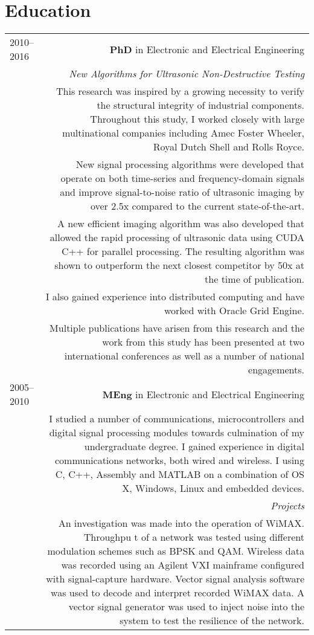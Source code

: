 \section*{Education}
\begin{longtable}{L!{\VRule}R}
2010--2016&\textbf{PhD} in Electronic and Electrical Engineering\\
& \textit{New Algorithms for Ultrasonic Non-Destructive Testing} \\[5pt]
& This research was inspired by a growing necessity to verify the structural integrity of industrial components. Throughout this study, I worked closely with large multinational companies including Amec Foster Wheeler, Royal Dutch Shell and Rolls Royce.\\[5pt]
& New signal processing algorithms were developed that operate on both time-series and frequency-domain signals and improve signal-to-noise ratio of ultrasonic imaging by over 2.5x compared to the current state-of-the-art.\\[5pt]
& A new efficient imaging algorithm was also developed that allowed the rapid processing of ultrasonic data using CUDA C++ for parallel processing. The resulting algorithm was shown to outperform the next closest competitor by 50x at the time of publication.\\[5pt]
& I also gained experience into distributed computing and have worked with Oracle Grid Engine. \\ [5pt]
& Multiple publications have arisen from this research and the work from this study has been presented at two international conferences as well as a number of national engagements.\\[5pt]
2005--2010&\textbf{MEng} in Electronic and Electrical Engineering\\[5pt]
&I studied a number of communications, microcontrollers and digital signal processing modules towards culmination of my undergraduate degree. I gained experience in digital communications networks, both wired and wireless. I using C, C++, Assembly and MATLAB on a combination of OS X, Windows, Linux and embedded devices.\\[5pt]
&\textit{Projects}\\[5pt]
&An investigation was made into the operation of WiMAX. Throughpu t of a network was tested using different modulation schemes such as BPSK and QAM. Wireless data was recorded using an Agilent VXI mainframe configured with signal-capture hardware. Vector signal analysis software was used to decode and interpret recorded WiMAX data. A vector signal generator was used to inject noise into the system to test the resilience of the network. \\[15pt]

\end{longtable}
